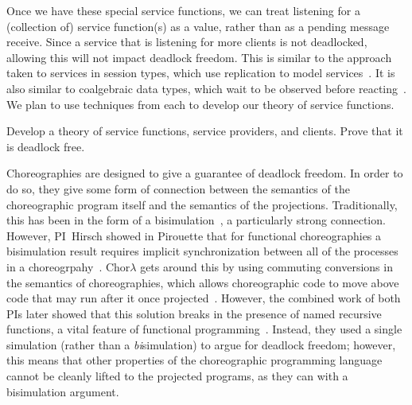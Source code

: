 Once we have these special service functions, we can treat listening for a (collection of) service function(s) as a value, rather than as a pending message receive.
Since a service that is listening for more clients is not deadlocked, allowing this will not impact deadlock freedom.
This is similar to the approach taken to services in session types, which use replication to model services~\cite{DeYoungCPT09,CairesP10,Wadler12,LeBrunFD25}.
It is also similar to coalgebraic data types, which wait to be observed before reacting~\cite{KozenS17}.
We plan to use techniques from each to develop our theory of service functions.

\begin{goal}
  \label{goal:wait-until-called}
  Develop a theory of service functions, service providers, and clients.
  Prove that it is deadlock free.
\end{goal}


\iffalse
{}

Choreographies are designed to give a guarantee of deadlock freedom.
In order to do so, they give some form of connection between the semantics of the choreographic program itself and the semantics of the projections.
Traditionally, this has been in the form of a bisimulation~\cite{Montesi13,Cruz-FilipeM17,HirschG22,Montesi23}, a particularly strong connection.
However, PI~Hirsch showed in Pirouette that for functional choreographies a bisimulation result requires implicit synchronization between all of the processes in a choreogrpahy~\cite{HirschG22}.
Chor$\lambda$ gets around this by using commuting conversions in the semantics of choreographies, which allows choreographic code to move above code that may run after it once projected~\cite{CruzFilipeGLMP23,CruzFilipeGLMP22}.
However, the combined work of both PIs later showed that this solution breaks in the presence of named recursive functions, a vital feature of functional programming~\cite{SamuelsonHC25}.
Instead, they used a single simulation (rather than a \emph{bi}simulation) to argue for deadlock freedom; however, this means that other properties of the choreographic programming language cannot be cleanly lifted to the projected programs, as they can with a bisimulation argument.

